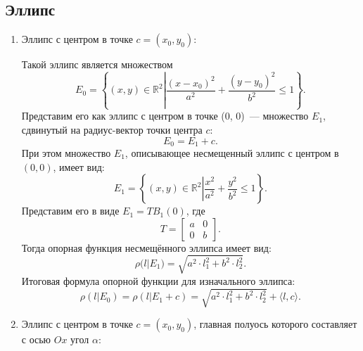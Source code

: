 \documentclass[11pt]{article}
\theoremstyle{definition}
\begin{document}
        \subsection {\bf Эллипс} 
        \begin{enumerate}
            
            \item Эллипс с центром в точке $c = (x_0, y_0)$:
            
            Такой эллипс является множеством
            \[E_0 = \left\{(x, y) \in \mathbb{R}^2 \left| \frac{(x - x_0)^2}{a^2} + \frac{(y - y_0)^2}{b^2} \right. \leqslant 1\right\}.
            \] 
            Представим его как эллипс с центром в точке (0, 0)~--- множество $E_1$, сдвинутый на радиус-вектор точки центра $c$:
            \[
            E_0 =  E_1 + c.
            \]
            При этом множество $E_1$, описывающее несмещенный эллипс с центром в $(0, 0)$, имеет вид:
            \[E_1 = \left\{(x, y) \in \mathbb{R}^2 \left| \frac{x^2}{a^2} + \frac{y^2}{b^2} \right. \leqslant 1\right\}.
            \] 
            Представим его в виде $E_1 = TB_1(0)$, где 
            \[
            T = \begin{bmatrix} a & 0 \\ 0 & b \end{bmatrix}.
            \]
            Тогда опорная функция несмещённого эллипса имеет вид:
            \[\rho\left.( l\right|E_1) = \sqrt{a^2\cdot l_1^2 + b^2\cdot l_2^2} .
            \]
            Итоговая формула опорной функции для изначального эллипса:
            \[\rho( l \left| E_0\right.) = \rho( l \left| E_1\right. + c) = \sqrt{a^2\cdot l_1^2 + b^2\cdot l_2^2} + \langle l, c\rangle. 
            \]
            
            \item Эллипс с центром в точке $c = (x_0, y_0)$, главная полуось которого составляет с осью $Ox$ угол $\alpha$:
            

\end{enumerate}
\end{document}
